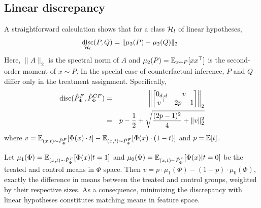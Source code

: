 \subsection{Linear discrepancy}
\label{sec:lindisc}
A straightforward calculation shows that for a class $\mathcal{H}_l$ of linear hypotheses, $$\operatorname*{disc}_{\mathcal{H}_l}(P,Q) = \|\mu_2(P) - \mu_2(Q)\|_2~.$$ Here, $\|A\|_2$ is the spectral norm of $A$ and $\mu_2(P) = \operatorname*{\mathbb{E}}_{x \sim P}[xx^\top]$ is the second-order moment of $x \sim P$. In the special case of counterfactual inference, $P$ and $Q$ differ only in the treatment assignment. Specifically,
\begin{align}
\text{disc}(\hat{P}_\Phi^{F},\hat{P}_\Phi^{CF}) &=&
\left\|
\begin{bmatrix}
    0_{d,d} & v \\
    v^\top & 2p-1
\end{bmatrix}
\right\|_2 \\
&=& p - \frac{1}{2} + \sqrt{\frac{(2p-1)^2}{4} + \|v\|_2^2}
\label{eq:lindisc}
\end{align}
where $v = \operatorname*{\mathbb{E}}_{(x,t) \sim \hat{P}_\Phi^{F}}[\Phi(x)\cdot t] -  \operatorname*{\mathbb{E}}_{(x,t) \sim \hat{P}_\Phi^{F}}[\Phi(x) \cdot (1-t)]$ and $p = \operatorname*{\mathbb{E}}[t]$.

Let $\mu_1(\Phi) = \operatorname*{\mathbb{E}}_{(x,t) \sim \hat{P}_\Phi^{F}}[\Phi(x)|t=1]$ and $\mu_0(\Phi) = \operatorname*{\mathbb{E}}_{(x,t) \sim \hat{P}_\Phi^{F}}[\Phi(x)|t=0]$ be the treated and control means in $\Phi$ space. Then $v = p\cdot \mu_1(\Phi) - (1-p)\cdot \mu_0(\Phi)$, exactly the difference in means between the treated and control groups, weighted by their respective sizes.
As a consequence, minimizing the discrepancy with linear hypotheses constitutes matching means in feature space.
